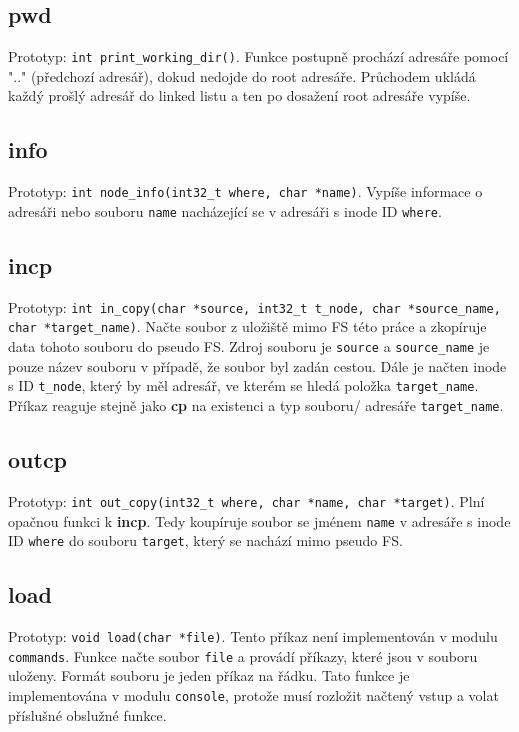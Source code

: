\documentclass[12pt]{report}
\begin{document}
\subsection{pwd}
Prototyp: \texttt{int print\_working\_dir()}. Funkce postupně prochází adresáře pomocí ".." (předchozí adresář),
dokud nedojde do root adresáře. Průchodem ukládá každý prošlý adresář do linked listu a ten po dosažení root
adresáře vypíše.
\subsection{info}
Prototyp: \texttt{int node\_info(int32\_t where, char *name)}. Vypíše informace o adresáři nebo souboru 
\texttt{name} nacházející se v adresáři s inode ID \texttt{where}.
\subsection{incp}
Prototyp: \texttt{int in\_copy(char *source, int32\_t t\_node, char *source\_name, char *target\_name)}.
Načte soubor z uložiště mimo FS této práce a zkopíruje data tohoto souboru do pseudo FS. Zdroj souboru
je \texttt{source} a \texttt{source\_name} je pouze název souboru v případě, že soubor byl zadán cestou.
Dále je načten inode s ID \texttt{t\_node}, který by měl adresář, ve kterém se hledá položka
\texttt{target\_name}. Příkaz reaguje stejně jako \textbf{cp} na existenci a typ souboru/ adresáře
\texttt{target\_name}.
\subsection{outcp}
Prototyp: \texttt{int out\_copy(int32\_t where, char *name, char *target)}. Plní opačnou funkci k \textbf{incp}.
Tedy koupíruje soubor se jménem \texttt{name} v adresáře s inode ID \texttt{where} do souboru \texttt{target}, 
který se nachází mimo pseudo FS.
\subsection{load}
Prototyp: \texttt{void load(char *file)}. Tento příkaz není implementován v modulu
\texttt{commands}. Funkce načte soubor \texttt{file} a provádí příkazy, které jsou v souboru uloženy.
Formát souboru je jeden příkaz na řádku. Tato funkce je implementována v modulu \texttt{console}, protože
musí rozložit načtený vstup a volat příslušné obslužné funkce.
\end{document}
